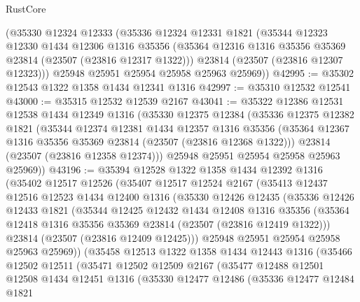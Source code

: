 \begin{lexlean}{RustCore}
\begin{coremodule}
    (@35330
      @12324
      @12333
      (@35336
        @12324
        @12331
        @1821
        (@35344
          @12323
          @12330
          @1434
          @12306
          @1316
          @35356
          (@35364 @12316 @1316 @35356 @35369 @23814 (@23507 (@23816 @12317 @1322)))
          @23814
          (@23507 (@23816 @12307 @12323)))
        @25948
        @25951
        @25954
        @25958
        @25963
        @25969))
@42995 := @35302 @12543 @1322 @1358 @1434 @12341 @1316
@42997 := @35310 @12532 @12541
@43000 := @35315 @12532 @12539 @2167
@43041 := @35322
    @12386
    @12531
    @12538
    @1434
    @12349
    @1316
    (@35330
      @12375
      @12384
      (@35336
        @12375
        @12382
        @1821
        (@35344
          @12374
          @12381
          @1434
          @12357
          @1316
          @35356
          (@35364 @12367 @1316 @35356 @35369 @23814 (@23507 (@23816 @12368 @1322)))
          @23814
          (@23507 (@23816 @12358 @12374)))
        @25948
        @25951
        @25954
        @25958
        @25963
        @25969))
@43196 := @35394
    @12528
    @1322
    @1358
    @1434
    @12392
    @1316
    (@35402
      @12517
      @12526
      (@35407
        @12517
        @12524
        @2167
        (@35413
          @12437
          @12516
          @12523
          @1434
          @12400
          @1316
          (@35330
            @12426
            @12435
            (@35336
              @12426
              @12433
              @1821
              (@35344
                @12425
                @12432
                @1434
                @12408
                @1316
                @35356
                (@35364 @12418 @1316 @35356 @35369 @23814 (@23507 (@23816 @12419 @1322)))
                @23814
                (@23507 (@23816 @12409 @12425)))
              @25948
              @25951
              @25954
              @25958
              @25963
              @25969))
          (@35458
            @12513
            @1322
            @1358
            @1434
            @12443
            @1316
            (@35466
              @12502
              @12511
              (@35471
                @12502
                @12509
                @2167
                (@35477
                  @12488
                  @12501
                  @12508
                  @1434
                  @12451
                  @1316
                  (@35330
                    @12477
                    @12486
                    (@35336
                      @12477
                      @12484
                      @1821

\end{coremodule}
\end{lexlean}
